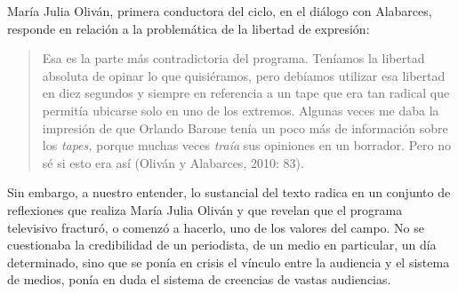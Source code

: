 María Julia Oliván, primera conductora del ciclo, en el diálogo con Alabarces, responde en relación a la problemática de la libertad de expresión:

\begin{quote}
Esa es la parte más contradictoria del programa. Teníamos la libertad absoluta de opinar lo que quisiéramos, pero debíamos utilizar esa libertad en diez segundos y siempre en referencia a un tape que era tan radical que permitía ubicarse solo en uno de los extremos. Algunas veces me daba la impresión de que Orlando Barone tenía un poco más de información sobre los \emph{tapes,} porque muchas veces \emph{traía} sus opiniones en un borrador. Pero no sé si esto era así (Oliván y Alabarces, 2010: 83).
\end{quote}

Sin embargo, a nuestro entender, lo sustancial del texto radica en un conjunto de reflexiones que realiza María Julia Oliván y que revelan que el programa televisivo fracturó, o comenzó a hacerlo, uno de los valores del campo. No se cuestionaba la credibilidad de un periodista, de un medio en particular, un día determinado, sino que se ponía en crisis el vínculo entre la audiencia y el sistema de medios, ponía en duda el sistema de creencias de vastas audiencias.

